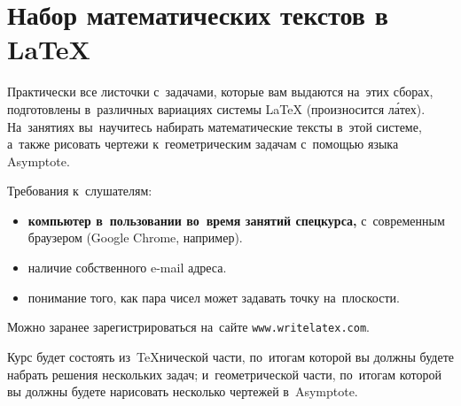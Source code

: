 \section*{Набор математических текстов в {\LaTeX}}

Практически все листочки с~задачами, которые вам выдаются на~этих сборах,
подготовлены в~различных вариациях системы {\LaTeX} (произносится л\'{а}тех).
На~занятиях вы~научитесь набирать математические тексты в~этой системе,
а~также рисовать чертежи к~геометрическим задачам с~помощью языка Asymptote.

Требования к~слушателям:
\begin{itemize}
\item
\textbf{компьютер в~пользовании во~время занятий спецкурса,}
с~современным браузером (Google Chrome, например).
\item
наличие собственного e-mail адреса.
\item
понимание того, как пара чисел может задавать точку на~плоскости.
\end{itemize}

Можно заранее зарегистрироваться на~сайте \texttt{www.writelatex.com}.

Курс будет состоять из~\TeX нической части, по~итогам которой вы должны будете
набрать решения нескольких задач;
и~геометрической части, по~итогам которой вы должны будете нарисовать несколько
чертежей в~Asymptote.

